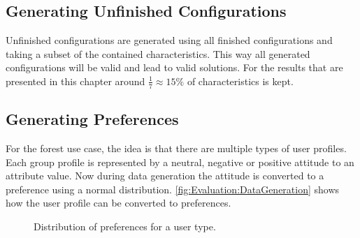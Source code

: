 \subsection{Generating Unfinished Configurations}

Unfinished configurations are generated using all finished configurations and taking a subset of the contained characteristics. This way all generated configurations will be valid and lead to valid solutions. For the results that are presented in this chapter around $\frac{1}{7} \approx 15\%$ of characteristics is kept.


\subsection{Generating Preferences}

For the forest use case, the idea is that there are multiple types of user profiles. Each group profile is represented by a neutral, negative or positive attitude to an attribute value. Now during data generation the attitude is converted to a preference using a normal distribution. \autoref{fig:Evaluation:DataGeneration} shows how the user profile can be converted to preferences.

\pgfplotsset{height=5cm,width=\textwidth,compat=1.8}
\begin{figure}
 \caption{Distribution of preferences for a user type.}
\label{fig:Evaluation:DataGeneration}
\end{figure}


